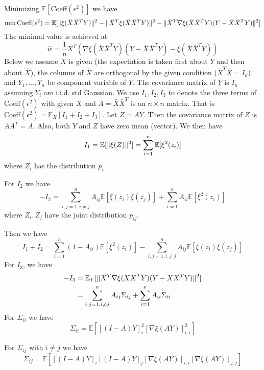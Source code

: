 \documentclass{article}
\DeclarePairedDelimiter\norm{\lVert}{\rVert}
\def\E{\mathbb{E}}
\begin{document}
Minimizing $\E[\textrm{Coeff}(\epsilon^2)]$ we have
\begin{equation}
\min \textrm{Coeff}(\epsilon^2) = \E[\norm{\xi(\bar{X}\bar{X}^TY)}^2 - \norm{\bar{X}^T\xi(\bar{X}\bar{X}^TY)}^2 - \norm{\bar{X}^T \nabla\xi(\bar{X}\bar{X}^TY)(Y-\bar{X}\bar{X}^TY)}^2]
\end{equation}
The minimal value is achieved at 
$$
\hat{w} = \frac{1}{n} X^T(\nabla\xi(\bar{X}\bar{X}^T Y)
(Y-\bar{X}\bar{X}^T Y) - \xi(\bar{X}\bar{X}^T Y))
$$
Below we assume $\bar{X}$ is given (the expectation is taken first about $Y$ and then about $\bar{X}$), the columns of $\bar{X}$ are orthogonal by the given condition ($\bar{X}^T\bar{X}=I_k$) and $Y_1, \dots, Y_n $ be component variable of $Y$. The covariance matrix of $Y$ is $I_n$ assuming $Y_i$ are i.i.d. std Gaussian. We use $I_1, I_2, I_3$ to denote the three terms of $\textrm{Coeff}(\epsilon^2)$ with given $X$ and $A=\bar{X}\bar{X}^T$ is an $n\times n$ matrix. That is $ \textrm{Coeff}(\epsilon^2) = \E_{X} [I_1 + I_2 + I_3]$.
Let $Z = AY$. Then the covariance matrix of $Z$ is $AA^T = A$.
Also, both $Y$ and $Z$ have zero mean (vector). We then have
\begin{equation*}
I_1 =\E[\norm{\xi(Z)}^2] = \sum_{i=1}^n \E[\xi^2(z_i)]
\end{equation*}
where $Z_i$ has the distribution $p_i$.
 
For $I_2$
we have
\begin{equation*}
-I_2   = \sum_{i,j=1, i \neq j}^n A_{ij}\E[\xi(z_i)\xi(z_j)] + \sum_{i=1}^n A_{ii}  \E[\xi^2(z_i)]
\end{equation*}
where $Z_i, Z_j$ have the joint distribution $p_{ij}$.

Then we have
\begin{equation}\label{eq:I1plusI2}
I_1+ I_2 =   \sum_{i=1}^n (1-A_{ii}) \E[\xi^2(z_i)]  - \sum_{i,j=1, i \neq j}^n A_{ij}\E[\xi(z_i)\xi(z_j)] 
\end{equation}
For $I_3$, we have
\begin{align*}
-I_3 & = \E_Y[\norm{X^T \nabla\xi(XX^TY)(Y-XX^TY)}^2] \\ 
 & = \sum_{i,j=1, i \neq j}^n A_{ij}\Sigma_{ij} + \sum_{i=1}^n A_{ii}\Sigma_{ii} 
\end{align*}
For $\Sigma_{ii}$ we have
\begin{equation}\label{eq:sigmaii}
\Sigma_{ii} =  \E[ [(I-A)Y]_i^2 [\nabla \xi(AY)]_{i,i}^2]
\end{equation}

For $\Sigma_{ij}$ with $i\neq j$ we have
\begin{equation*}
\Sigma_{ij} =  \E[ [(I-A)Y]_i [(I-A)Y]_j [\nabla \xi(AY)]_{i,i} [\nabla \xi(AY)]_{j,j}]
\end{equation*}
\end{document}
